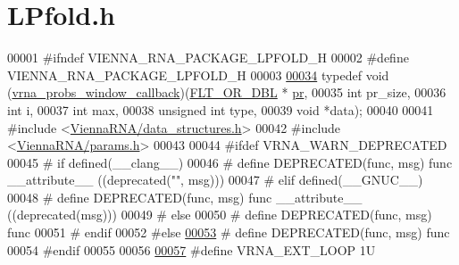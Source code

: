 \hypertarget{_l_pfold_8h_source}{}\section{L\+Pfold.\+h}
\label{_l_pfold_8h_source}

\begin{DoxyCode}
00001 \textcolor{preprocessor}{#ifndef VIENNA\_RNA\_PACKAGE\_LPFOLD\_H}
00002 \textcolor{preprocessor}{#define VIENNA\_RNA\_PACKAGE\_LPFOLD\_H}
00003 
\mbox{\hyperlink{_l_pfold_8h_abe710a1182e6db69cc75329dfc9bed67}{00034}} \textcolor{keyword}{typedef} void (\mbox{\hyperlink{_l_pfold_8h_abe710a1182e6db69cc75329dfc9bed67}{vrna\_probs\_window\_callback}})(\mbox{\hyperlink{group__data__structures_ga31125aeace516926bf7f251f759b6126}{FLT\_OR\_DBL}}    *
      \mbox{\hyperlink{fold__vars_8h_ac98ec419070aee6831b44e5c700f090f}{pr}},
00035                                           \textcolor{keywordtype}{int}           pr\_size,
00036                                           \textcolor{keywordtype}{int}           i,
00037                                           \textcolor{keywordtype}{int}           max,
00038                                           \textcolor{keywordtype}{unsigned} \textcolor{keywordtype}{int}  type,
00039                                           \textcolor{keywordtype}{void}          *data);
00040 
00041 \textcolor{preprocessor}{#include <\mbox{\hyperlink{data__structures_8h}{ViennaRNA/data\_structures.h}}>}
00042 \textcolor{preprocessor}{#include <\mbox{\hyperlink{params_8h}{ViennaRNA/params.h}}>}
00043 
00044 \textcolor{preprocessor}{#ifdef VRNA\_WARN\_DEPRECATED}
00045 \textcolor{preprocessor}{# if defined(\_\_clang\_\_)}
00046 \textcolor{preprocessor}{#  define DEPRECATED(func, msg) func \_\_attribute\_\_ ((deprecated("", msg)))}
00047 \textcolor{preprocessor}{# elif defined(\_\_GNUC\_\_)}
00048 \textcolor{preprocessor}{#  define DEPRECATED(func, msg) func \_\_attribute\_\_ ((deprecated(msg)))}
00049 \textcolor{preprocessor}{# else}
00050 \textcolor{preprocessor}{#  define DEPRECATED(func, msg) func}
00051 \textcolor{preprocessor}{# endif}
00052 \textcolor{preprocessor}{#else}
\mbox{\hyperlink{_l_pfold_8h_aab347a3c03fbe8e7319551b9fa0cce4a}{00053}} \textcolor{preprocessor}{# define DEPRECATED(func, msg) func}
00054 \textcolor{preprocessor}{#endif}
00055 
00056 
\mbox{\hyperlink{_l_pfold_8h_af0bb577130090f6c856d1358804250bf}{00057}} \textcolor{preprocessor}{#define VRNA\_EXT\_LOOP   1U}

\end{DoxyCode}
